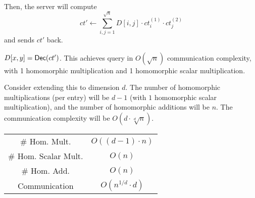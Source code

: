Then, the server will compute
\[ct'\leftarrow \sum^{\sqrt{n}}_{i,j=1}D[i,j]\cdot ct_i^{(1)}\cdot ct_j^{(2)}\]
and sends $ct'$ back.

$D[x,y] = \operatorname{\mathsf{Dec}}(ct')$. This achieves query in $O(\sqrt{n})$ communication complexity, with 1 homomorphic multiplication and 1 homomorphic scalar multiplication.

\begin{center}
    \def\svgwidth{0.2\columnwidth}
    
\end{center}


Consider extending this to dimension $d$. The number of homomorphic multiplications (per entry) will be $d-1$ (with $1$ homomorphic scalar multiplication), and the number of homomorphic additions will be $n$. The communication complexity will be $O(d\cdot \sqrt[d]{n})$.

\begin{center}
\begin{tabular}{c|c}
    \# Hom. Mult. & $O((d-1)\cdot n)$ \\
    \# Hom. Scalar Mult. & $O(n)$ \\
    \# Hom. Add. & $O(n)$ \\
    Communication & $O(n^{1/d}\cdot d)$
\end{tabular}
\end{center}

